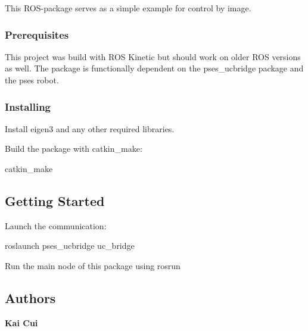 This R\+O\+S-\/package serves as a simple example for control by image.

\subsubsection*{Prerequisites}

This project was build with R\+OS Kinetic but should work on older R\+OS versions as well. The package is functionally dependent on the pses\+\_\+ucbridge package and the pses robot.

\subsubsection*{Installing}

Install eigen3 and any other required libraries.

Build the package with catkin\+\_\+make\+:

{\ttfamily catkin\+\_\+make}

\subsection*{Getting Started}

Launch the communication\+:

{\ttfamily roslaunch pses\+\_\+ucbridge uc\+\_\+bridge}

Run the main node of this package using rosrun

\subsection*{Authors}


\begin{DoxyItemize}
\item {\bfseries Kai Cui} 
\end{DoxyItemize}